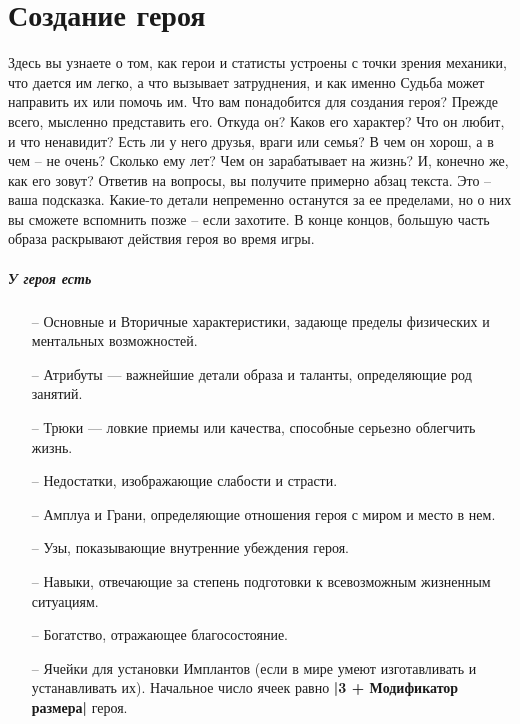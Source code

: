 \chapter{Создание героя}
Здесь вы узнаете о том, как герои и статисты устроены с точки зрения механики, что дается им легко, а что вызывает затруднения, и как именно Судьба может направить их или помочь им.
\newline Что вам понадобится для создания героя? Прежде всего, мысленно представить его. Откуда он? Каков его характер? Что он любит, и что ненавидит? Есть ли у него друзья, враги или семья? В чем он хорош, а в чем – не очень? Сколько ему лет? Чем он зарабатывает на жизнь? И, конечно же, как его зовут?
\newline Ответив на вопросы, вы получите примерно абзац текста. Это – ваша подсказка. Какие-то детали непременно останутся за ее пределами, но о них вы сможете вспомнить позже – если захотите. В конце концов, большую часть образа раскрывают действия героя во время игры. 

\paragraph{У героя есть}
\begin{itemize}
\item[--] Основные и Вторичные характеристики, задающе пределы физических и ментальных возможностей.
\item[--] Атрибуты — важнейшие детали образа и таланты, определяющие род занятий.
\item[--] Трюки — ловкие приемы или качества, способные серьезно облегчить жизнь.
\item[--] Недостатки, изображающие слабости и страсти.
\item[--] Амплуа и Грани, определяющие отношения героя с миром и место в нем.
\item[--] Узы, показывающие внутренние убеждения героя.
\item[--] Навыки, отвечающие за степень подготовки к всевозможным жизненным ситуациям.
\item[--] Богатство, отражающее благосостояние.
\item[--] Ячейки для установки Имплантов (если в мире умеют изготавливать и устанавливать их). Начальное число ячеек равно \textbf{|3 + Модификатор размера|} героя.
\end{itemize}



